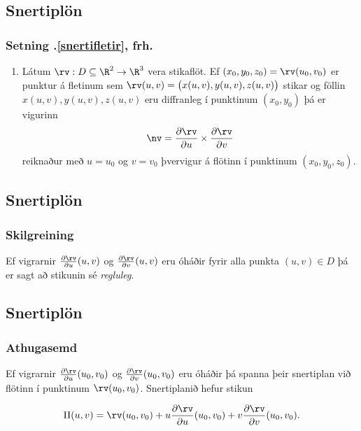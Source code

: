 \subsection{Snertiplön}
 \subsubsection{Setning \kaflanr.\ref{snertifletir}, frh.}
     \begin {enumerate}
    \item [3.] 
  Látum $\rv: D\subseteq \R^2\rightarrow \R^3$ vera stikaflöt.  
Ef $(x_0, y_0, z_0)=\rv(u_0, v_0)$ er punktur á fletinum sem 
$\rv(u,v)=\big(x(u,v), y(u,v), z(u,v)\big)$ stikar og
föllin $x(u,v), y(u,v), z(u,v)$ eru diffranleg í punktinum $(x_0,
y_0)$ þá er vigurinn
     $$\nv =\frac{\partial \rv}{\partial u}\times 
\frac{\partial \rv}{\partial v}$$
reiknaður með $u=u_0$ og $v=v_0$ þvervigur á flötinn í punktinum 
$(x_0, y_0, z_0)$.
\end {enumerate}
 



\subsection{Snertiplön} 

\subsubsection{Skilgreining  \rtask{}}
Ef vigrarnir $\frac{\partial \rv}{\partial
  u}(u,v)$ og    $\frac{\partial \rv}{\partial v}(u,v)$ eru óháðir
fyrir alla punkta $(u,v)\in D$ þá er sagt að stikunin sé {\em
  regluleg}. 

 






\subsection{Snertiplön} 

\subsubsection{Athugasemd \rtask{}}
Ef vigrarnir  
$\frac{\partial \rv}{\partial u}(u_0,v_0)$ og    $\frac{\partial
  \rv}{\partial v}(u_0,v_0)$ eru óháðir þá spanna þeir snertiplan við
flötinn í punktinum $\rv(u_0,v_0)$. Snertiplanið hefur stikun 

$$\Pi(u,v) = \rv(u_0,v_0)+u\frac{\partial \rv}{\partial u}(u_0,v_0)
+v\frac{\partial \rv}{\partial v}(u_0,v_0).$$






